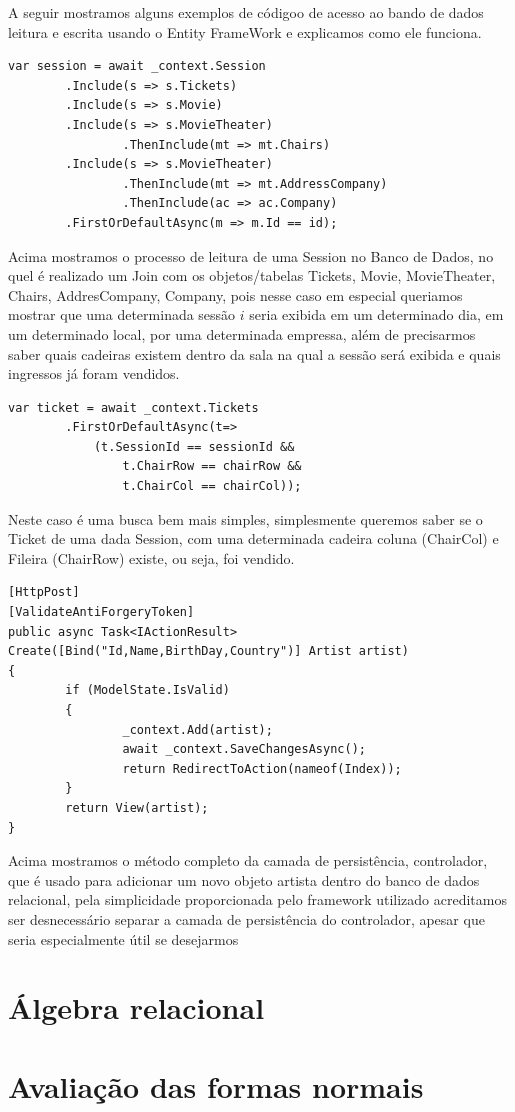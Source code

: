 \documentclass[a4paper,10pt]{article}
\begin{document}
A seguir mostramos alguns exemplos de códigoo de acesso ao bando de dados leitura e escrita usando o Entity FrameWork e explicamos como ele funciona.

\begin{lstlisting}
var session = await _context.Session
		.Include(s => s.Tickets)
		.Include(s => s.Movie)
		.Include(s => s.MovieTheater)
				.ThenInclude(mt => mt.Chairs)
		.Include(s => s.MovieTheater)
				.ThenInclude(mt => mt.AddressCompany)
				.ThenInclude(ac => ac.Company)
		.FirstOrDefaultAsync(m => m.Id == id);
\end{lstlisting}

Acima mostramos o processo de leitura de uma Session no Banco de Dados, no quel é realizado um Join com os objetos/tabelas Tickets, Movie, MovieTheater, Chairs, AddresCompany, Company, pois nesse caso em especial queriamos mostrar que uma determinada sessão $i$ seria exibida em um determinado dia, em um determinado local, por uma determinada empressa, além de precisarmos saber quais cadeiras existem dentro da sala na qual a sessão será exibida e quais ingressos já foram vendidos.

\begin{lstlisting}
var ticket = await _context.Tickets
		.FirstOrDefaultAsync(t=> 
			(t.SessionId == sessionId && 
				t.ChairRow == chairRow && 
				t.ChairCol == chairCol));
\end{lstlisting}

Neste caso é uma busca bem mais simples, simplesmente queremos saber se o Ticket de uma dada Session, com uma determinada cadeira coluna (ChairCol) e Fileira (ChairRow) existe, ou seja, foi vendido.

\begin{lstlisting}
[HttpPost]
[ValidateAntiForgeryToken]
public async Task<IActionResult> Create([Bind("Id,Name,BirthDay,Country")] Artist artist)
{
		if (ModelState.IsValid)
		{
				_context.Add(artist);
				await _context.SaveChangesAsync();
				return RedirectToAction(nameof(Index));
		}
		return View(artist);
}
\end{lstlisting}
Acima mostramos o método completo da camada de persistência, controlador, que é usado para adicionar um novo objeto artista dentro do banco de dados relacional, pela simplicidade proporcionada pelo framework utilizado acreditamos ser desnecessário separar a camada de persistência do controlador, apesar que seria especialmente útil se desejarmos 

\section{Álgebra relacional}

\section{Avaliação das formas normais}

%
% 
\end{document}
